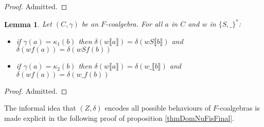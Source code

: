 \documentclass[a4paper]{article}
\newcommand{\semantics}[1]{\llbracket #1 \rrbracket}
\newtheorem{lemSemanticAndFagreeOnOneStep}[defNuF]{Lemma}
\begin{document}
\begin{proof}
Admitted.
\end{proof}


\begin{lemSemanticAndFagreeOnOneStep}

Let $(C, \gamma)$ be an $F$-coalgebra. For all $a$ in $C$ and $w$ in $\{S,
\_\}^*$:

\begin{itemize}
\item
  if $\gamma(a) = \kappa_1(b)$ then $\delta(w\semantics{a}) = \delta(wS
  \semantics{b})$ and $\delta(wf(a)) = \delta(wSf(b))$
\item
  if $\gamma(a) = \kappa_2(b)$ then $\delta(w\semantics{a}) =
  \delta(w\_\semantics{b})$ and $\delta(wf(a)) = \delta(w\_f(b))$
\end{itemize}

\end{lemSemanticAndFagreeOnOneStep}

\begin{proof}
Admitted.
\end{proof}


The informal idea that $(Z, \delta)$ encodes all possible behaviours of
$F$-coalgebras is made explicit in the following proof of proposition
\ref{thmDomNuFisFinal}.
\end{document}
